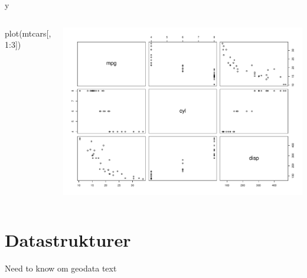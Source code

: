 \documentclass[
  8pt,
  ignorenonframetext,
  aspectratio=169]{beamer}
\newenvironment{Shaded}{}{}
\newcommand{\DecValTok}[1]{\textcolor[rgb]{0.25,0.63,0.44}{#1}}
\newcommand{\FunctionTok}[1]{\textcolor[rgb]{0.02,0.16,0.49}{#1}}
\newcommand{\NormalTok}[1]{#1}
\newcommand{\SpecialCharTok}[1]{\textcolor[rgb]{0.25,0.44,0.63}{#1}}
\newcommand{\columnsbegin}{\begin{columns}}
\newcommand{\columnsend}{\end{columns}}
\begin{document}
\begin{frame}[fragile]{y}
\protect\hypertarget{y}{}
\columnsbegin
{}

\begin{Shaded}
\begin{Highlighting}[]
\FunctionTok{plot}\NormalTok{(mtcars[, }\DecValTok{1}\SpecialCharTok{:}\DecValTok{3}\NormalTok{])}
\end{Highlighting}
\end{Shaded}


\includegraphics{crashcourse_slides_files/figure-beamer/unnamed-chunk-4-1.pdf}
\columnsend
\end{frame}

\hypertarget{datastrukturer}{%
\section{Datastrukturer}\label{datastrukturer}}

\begin{frame}{Need to know om geodata}
\protect\hypertarget{need-to-know-om-geodata}{}
text
\end{frame}
\end{document}
